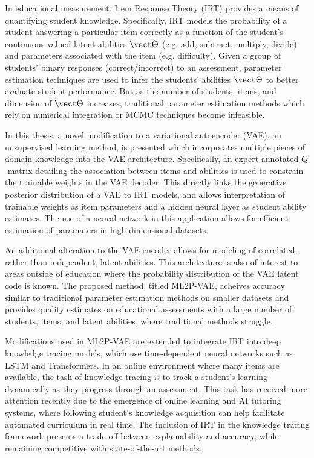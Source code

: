 
In educational measurement, Item Response Theory (IRT) provides a means of quantifying student knowledge. Specifically, IRT models the probability of a student answering a particular item correctly as a function of the student's continuous-valued latent abilities $\vect \Theta$ (e.g. add, subtract, multiply, divide) and parameters associated with the item (e.g. difficulty). Given a group of students' binary responses (correct/incorrect) to an assessment, parameter estimation techniques are used to infer the students' abilities $\vect \Theta$ to better evaluate student performance. But as the number of students, items, and dimension of $\vect \Theta$ increases, traditional parameter estimation methods which rely on numerical integration or MCMC techniques become infeasible. 

In this thesis, a novel modification to a variational autoencoder (VAE), an unsupervised learning method, is presented which incorporates multiple pieces of domain knowledge into the VAE architecture. Specifically, an expert-annotated $Q$-matrix detailing the association between items and abilities is used to constrain the trainable weights in the VAE decoder. This directly links the generative posterior distribution of a VAE to IRT models, and allows interpretation of trainable weights as item parameters and a hidden neural layer as student ability estimates. The use of a neural network in this application allows for efficient estimation of paramaters in high-dimensional datasets.

An additional alteration to the VAE encoder allows for modeling of correlated, rather than independent, latent abilities. This architecture is also of interest to areas outside of education where the probability distribution of the VAE latent code is known. The proposed method, titled ML2P-VAE, acheives accuracy similar to traditional parameter estimation methods on smaller datasets and provides quality estimates on educational assessments with a large number of students, items, and latent abilities, where traditional methods struggle.

Modifications used in ML2P-VAE are extended to integrate IRT into deep knowledge tracing models, which use time-dependent neural networks such as LSTM and Transformers. In an online environment where many items are available, the task of knowledge tracing is to track a student's learning dynamically as they progress through an assessment. This task has received more attention recently due to the emergence of online learning and AI tutoring systems, where following student's knowledge acquisition can help facilitate automated curriculum in real time. The inclusion of IRT in the knowledge tracing framework presents a trade-off between explainability and accuracy, while remaining competitive with state-of-the-art methods.


